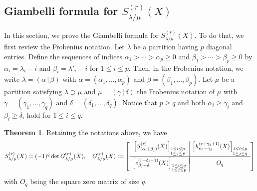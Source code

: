 \documentclass[12pt]{amsart}%
\theoremstyle{definition}
\newtheorem{theorem}{Theorem}[section]
\begin{document}
\subsection{Giambelli formula for $S^{(r)}_{\lambda/\mu}(X)$}
\label{sebsec:Giambelli}
In this section, we prove the Giambelli formula for $S^{(r)}_{\lambda/\mu}(X)$.
To do that, we first review the Frobenius notation.
Let $\lambda$ be a partition having $p$ diagonal entries. Define the sequences of indices $\alpha_1>\cdots>\alpha_p\ge 0$ and $\beta_1>\cdots>\beta_p\ge 0$ by $\alpha_i=\lambda_i-i$ and $\beta_i=\lambda'_i-i$ for $1\le i\le p$.
Then, in the Frobenius notation, we write $\lambda=(\alpha\,|\,\beta)$ with $\alpha=(\alpha_1,\ldots,\alpha_p)$ and $\beta=(\beta_1,\ldots,\beta_p)$.
Let $\mu$ be a partition satisfying $\lambda\supset\mu$ and 
$\mu=(\gamma\,|\,\delta)$ the Frobenius notation of $\mu$ with $\gamma=(\gamma_1,\ldots,\gamma_q)$ and $\delta=(\delta_1,\ldots,\delta_q)$. 
Notice that $p\ge q$ and both $\alpha_i\ge \gamma_i$ and $\beta_i\ge\delta_i$ hold for $1\le i\le q$.

\begin{theorem}
\label{thm:Giambelli nnsy}
Retaining the notations above, we have
\begin{equation}
\label{for:Gambelli nnsy}
 S^{(r)}_{\lambda/\mu}(X)
=(-1)^q\det G^{(r)}_{\lambda/\mu}(X),
\quad 
G^{(r)}_{\lambda/\mu}(X)
:=\left[
\begin{array}{c|c}
\left[S^{(r)}_{(\alpha_i\,|\,\beta_j)}(X)\right]_{\substack{1\le i\le p \\ 1\le j\le p}} & 
\left[h^{(r+\gamma_j+1)}_{\alpha_i-\gamma_j}(X)\right]_{\substack{1\le i\le p \\ 1\le j\le q}} \\[10pt]
\hline \\[-10pt]
 \left[e^{(r-\delta_i-1)}_{\beta_j-\delta_i}(X)\right]_{\substack{1\le i\le q \\ 1\le j\le p}} & O_{q}
\end{array}
\right]
\end{equation}
with $O_{q}$ being the square zero matrix of size $q$.
\end{theorem}
\end{document}
